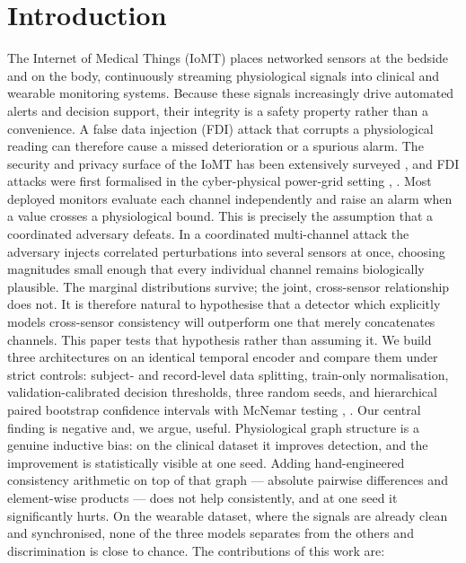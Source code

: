 \documentclass[conference]{IEEEtran}
\begin{document}
\section{Introduction}
The Internet of Medical Things (IoMT) places networked sensors at the bedside and on the body, continuously streaming physiological signals into clinical and wearable monitoring systems. Because these signals increasingly drive automated alerts and decision support, their integrity is a safety property rather than a convenience. A false data injection (FDI) attack that corrupts a physiological reading can therefore cause a missed deterioration or a spurious alarm. The security and privacy surface of the IoMT has been extensively surveyed \cite{alsubaei2017}, and FDI attacks were first formalised in the cyber-physical power-grid setting \cite{liu2011}, \cite{mo2012}.
Most deployed monitors evaluate each channel independently and raise an alarm when a value crosses a physiological bound. This is precisely the assumption that a coordinated adversary defeats. In a coordinated multi-channel attack the adversary injects correlated perturbations into several sensors at once, choosing magnitudes small enough that every individual channel remains biologically plausible. The marginal distributions survive; the joint, cross-sensor relationship does not.
It is therefore natural to hypothesise that a detector which explicitly models cross-sensor consistency will outperform one that merely concatenates channels. This paper tests that hypothesis rather than assuming it. We build three architectures on an identical temporal encoder and compare them under strict controls: subject- and record-level data splitting, train-only normalisation, validation-calibrated decision thresholds, three random seeds, and hierarchical paired bootstrap confidence intervals with McNemar testing \cite{efron1993}, \cite{dietterich1998}.
Our central finding is negative and, we argue, useful. Physiological graph structure is a genuine inductive bias: on the clinical dataset it improves detection, and the improvement is statistically visible at one seed. Adding hand-engineered consistency arithmetic on top of that graph --- absolute pairwise differences and element-wise products --- does not help consistently, and at one seed it significantly hurts. On the wearable dataset, where the signals are already clean and synchronised, none of the three models separates from the others and discrimination is close to chance.
The contributions of this work are:
\end{document}
